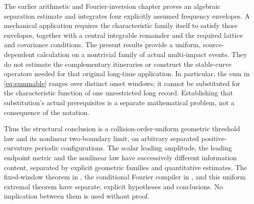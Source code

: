 The earlier arithmetic and Fourier-inversion chapter \cite{A2R33} proves
an algebraic separation estimate and integrates four explicitly assumed
frequency envelopes. A mechanical application requires the characteristic
family itself to satisfy those envelopes, together with a central
integrable remainder and the required lattice and covariance conditions.
The present results provide a uniform, source-dependent calculation on a
nontrivial family of actual multi-impact events. They do not estimate the
complementary itineraries or construct the stable-curve operators needed
for that original long-time application. In particular, the sum in
\eqref{eq:summable} ranges over distinct onset windows; it cannot be
substituted for the characteristic function of one unrestricted long
record. Establishing that substitution's actual prerequisites is a
separate mathematical problem, not a consequence of the notation.

Thus the structural conclusion is a collision-order-uniform geometric
threshold law and its nonlinear two-boundary limit, on arbitrary
separated positive-curvature periodic configurations. The scalar
leading amplitude, the leading endpoint metric and the nonlinear law
have successively different information content, separated by explicit
geometric families and quantitative estimates. The
fixed-window theorem in \cite{TC}, the conditional Fourier compiler in
\cite{A2R33}, and this uniform extremal theorem have separate, explicit
hypotheses and conclusions. No implication between them is used without
proof.
